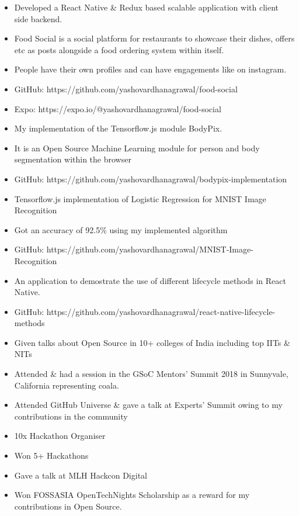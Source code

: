 \begin{itemize}
\item Developed a React Native \& Redux based scalable application with client side backend.
\item Food Social is a social platform for restaurants to showcase their dishes, offers etc as posts alongside a food ordering system within itself. 
\item People have their own profiles and can have engagements like on instagram.
\item GitHub: https://github.com/yashovardhanagrawal/food-social
\item Expo: https://expo.io/@yashovardhanagrawal/food-social
\end{itemize}
\smallskip
{}
\begin{itemize}
\item My implementation of the Tensorflow.js module BodyPix.
\item It is an Open Source Machine Learning module for person and body segmentation within the browser
\item GitHub: https://github.com/yashovardhanagrawal/bodypix-implementation
\end{itemize}
\smallskip
{}
\begin{itemize}
\item Tensorflow.js implementation of Logistic Regression for MNIST Image Recognition
\item Got an accuracy of 92.5\% using my implemented algorithm
\item GitHub: https://github.com/yashovardhanagrawal/MNIST-Image-Recognition
\end{itemize}
\smallskip
{}
\begin{itemize}
\item An application to demostrate the use of different lifecycle methods in React Native.
\item GitHub: https://github.com/yashovardhanagrawal/react-native-lifecycle-methods
\end{itemize}

\begin{itemize}
    \item Given talks about Open Source in 10+ colleges of India including top IITs \& NITs
    \item Attended \& had a session in the GSoC Mentors' Summit 2018 in Sunnyvale, California representing coala.
    \item Attended GitHub Universe \& gave a talk at Experts' Summit owing to my contributions in the community
    \item 10x Hackathon Organiser
    \item Won 5+ Hackathons
    \item Gave a talk at MLH Hackcon Digital
    \item Won FOSSASIA OpenTechNights Scholarship as a reward for my contributions in Open Source.
\end{itemize}